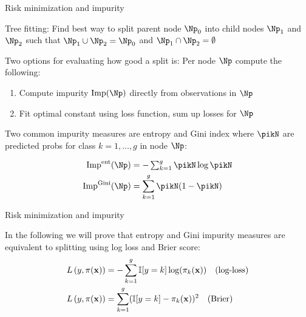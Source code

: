\documentclass[11pt,compress,t,notes=noshow, xcolor=table]{beamer}
\begin{document}
    

\begin{framei}[sep=M]{Risk minimization and impurity}

\item Tree fitting: Find best way to split parent node $\Np_0$ into child nodes $\Np_1$ and $\Np_2$ such that $\Np_1 \cup \Np_2 = \Np_0$ and $\Np_1 \cap \Np_2 = \emptyset$
\item Two options for evaluating how good a split is: Per node $\Np$ compute the following:
\begin{enumerate}
\item Compute impurity $\text{Imp}(\Np)$ directly from observations in $\Np$
\item Fit optimal constant using loss function, sum up losses for $\Np$
\end{enumerate}
\item  Two common impurity measures are entropy and Gini index where $\pikN$ are predicted probs for class $k=1,\ldots,g$ in node $\Np$:

\begin{align*}
    \text{Imp}^{\text{ent}}(\Np) &= -\textstyle\sum_{k = 1}^g \pikN \log \pikN\\
    \text{Imp}^{\text{Gini}}(\Np) &= \sum_{k=1}^g \pikN (1-\pikN )
\end{align*}


\end{framei}


\begin{framei}[sep=M]{Risk minimization and impurity}
\item In the following we will prove that entropy and Gini impurity measures are equivalent to splitting using log loss and Brier score:
\begin{align*}
    L\left(y, \pi(\mathbf{x})\right) &= -\sum_{k = 1}^g \mathbb{I} [y=k] \log (\pi_k(\mathbf{x})) \quad \text{(log-loss)}\\
    L\left(y, \pi(\mathbf{x})\right) &= \sum_{k = 1}^g (\mathbb{I} [y=k] - \pi_k(\mathbf{x}))^2 \quad \text{(Brier)}
\end{align*}


\end{framei}
\end{document}

